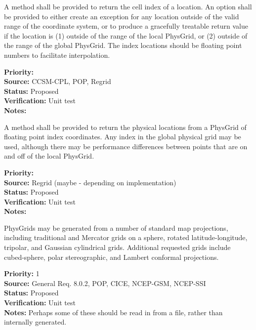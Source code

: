 A method shall be provided to return the cell index of a location.  An option shall
be provided to either create an exception for any location outside of the valid
range of the coordinate system, or to produce a gracefully treatable return value if
the location is (1) outside of the range of the local PhysGrid, or (2) outside of the
range of the global PhysGrid.  The index locations should be floating point numbers to
facilitate interpolation.
\begin{reqlist}
{\bf Priority:} \\
{\bf Source:} CCSM-CPL, POP, Regrid \\
{\bf Status:} Proposed \\
{\bf Verification:} Unit test \\
{\bf Notes:} 
\end{reqlist}

A method shall be provided to return the physical locations from a PhysGrid of
floating point index coordinates.  Any index in the global physical grid may be
used, although there may be performance differences between points that are on
and off of the local PhysGrid.
\begin{reqlist}
{\bf Priority:} \\
{\bf Source:} Regrid (maybe - depending on implementation) \\
{\bf Status:} Proposed \\
{\bf Verification:} Unit test \\
{\bf Notes:} 
\end{reqlist}


PhysGrids may be generated from a number of standard map projections, including
traditional and Mercator grids on a sphere, rotated latitude-longitude,
tripolar, and Gaussian cylindrical grids.  Additional requested grids include 
cubed-sphere, polar stereographic, and Lambert conformal projections.
\begin{reqlist}
{\bf Priority:} 1 \\
{\bf Source:} General Req. 8.0.2, POP, CICE, NCEP-GSM, NCEP-SSI \\
{\bf Status:} Proposed \\
{\bf Verification:} Unit test\\
{\bf Notes:}  Perhaps some of these should be read in from a file, rather than
internally generated.
\end{reqlist}

